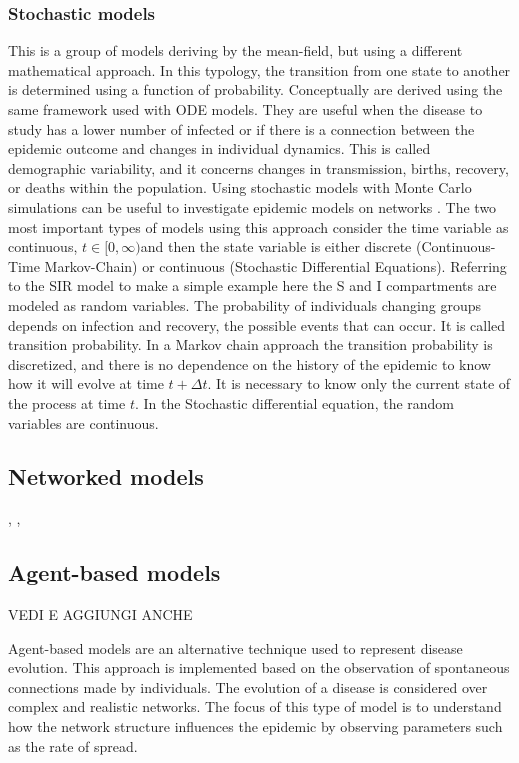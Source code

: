 \subsubsection{Stochastic models} 	
This is a group of models deriving by the mean-field, but using a different mathematical approach.
In this typology, the transition from one state to another is determined using a function of probability.  Conceptually are derived using the same framework used with ODE models. They are useful when the disease to study has a lower number of infected or if there is a connection between the epidemic outcome and changes in individual dynamics. This is called demographic variability, and it concerns changes in transmission, births, recovery, or deaths within the population. Using stochastic models with Monte Carlo simulations can be useful to investigate epidemic models on networks \cite{Allen2017}. 
The two most important types of models using this approach consider the time variable as continuous, $t \in [0, \infty) $and then the state variable is either discrete (Continuous-Time Markov-Chain) or continuous (Stochastic Differential Equations).
Referring to the SIR model to make a simple example here the S and I compartments are modeled as random variables. The probability of individuals changing groups depends on infection and recovery, the possible events that can occur. It is called transition probability. 
In a Markov chain approach the transition probability is discretized, and there is no dependence on the history of the epidemic to know how it will evolve at time $t + \Delta t$. It is necessary to know only the current state of the process at time $t$. 
In the Stochastic differential equation, the random variables are continuous. 

\subsection{Networked models}
\cite{Newman2002}, \cite{VanMieghem2009}, 


\subsection{Agent-based models}

VEDI E AGGIUNGI ANCHE \cite{Tizzoni2014}

Agent-based models are an alternative technique used to represent disease evolution. This approach is implemented based on the observation of spontaneous connections made by individuals. The evolution of a disease is considered over complex and realistic networks. The focus of this type of model is to understand how the network structure influences the epidemic by observing parameters such as the rate of spread.

